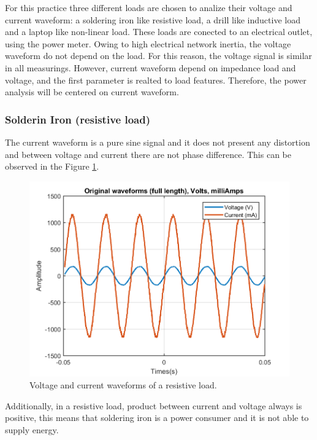 \documentclass[journal]{IEEEtran}
\begin{document}
For this practice three different loads are chosen to 
analize their voltage and current waveform: 
a soldering iron 
like resistive load, a drill like inductive load and 
a laptop like non-linear load. These loads are conected 
to an electrical outlet, using the power meter. Owing to 
high electrical network inertia, the voltage waveform do
not depend on the load. For this reason, the voltage signal
is similar in all measurings. However, current waveform 
depend on impedance load and voltage, and the first 
parameter is realted to load features. Therefore, the 
power analysis will be centered on current waveform.\\

\subsubsection{Solderin Iron (resistive load)}
The current waveform is a pure sine signal and it does not 
present any distortion and between voltage and current there
are not phase difference. This can be observed in the Figure
\ref{original_resistive_load}. 

\begin{figure}[h]
\centering
\includegraphics[clip,width=\columnwidth]{original_waveform_cautin.png}
\caption{Voltage and current waveforms of a resistive load.}
\label{original_resistive_load}
\end{figure}

Additionally, in a resistive load, product between 
current and voltage always 
is positive, this means that soldering iron is a power 
consumer and it is not able to supply energy. 
\end{document}
